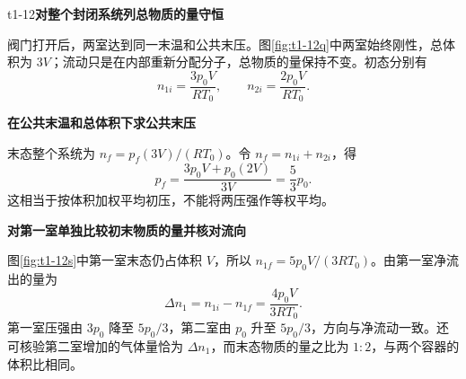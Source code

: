 \begin{drillsolution}{t1-12}\textbf{对整个封闭系统列总物质的量守恒}\par\nobreak
阀门打开后，两室达到同一末温和公共末压。图\ref{fig:t1-12q}中两室始终刚性，总体积为 $3V$；流动只是在内部重新分配分子，总物质的量保持不变。初态分别有
\[n_{1i}=\frac{3p_0V}{RT_0},\qquad n_{2i}=\frac{2p_0V}{RT_0}.\]


\par\medskip{}\noindent\textbf{在公共末温和总体积下求公共末压}\par\nobreak
末态整个系统为 $n_f=p_f(3V)/(RT_0)$。令 $n_f=n_{1i}+n_{2i}$，得
\[\boxed{p_f=\frac{3p_0V+p_0(2V)}{3V}=\frac53p_0}.\]
这相当于按体积加权平均初压，不能将两压强作等权平均。



\par\medskip{}\noindent\textbf{对第一室单独比较初末物质的量并核对流向}\par\nobreak
图\ref{fig:t1-12s}中第一室末态仍占体积 $V$，所以 $n_{1f}=5p_0V/(3RT_0)$。由第一室净流出的量为
\[\boxed{\Delta n_1=n_{1i}-n_{1f}=\frac{4p_0V}{3RT_0}}.\]
第一室压强由 $3p_0$ 降至 $5p_0/3$，第二室由 $p_0$ 升至 $5p_0/3$，方向与净流动一致。还可核验第二室增加的气体量恰为 $\Delta n_1$，而末态物质的量之比为 $1:2$，与两个容器的体积比相同。
\end{drillsolution}
